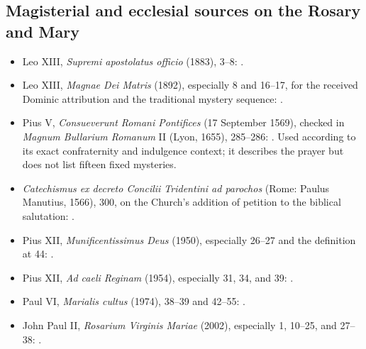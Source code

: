 \subsection{Magisterial and ecclesial sources on the Rosary and Mary}

\begin{itemize}
  \item Leo XIII, \emph{Supremi apostolatus officio} (1883), 3--8: .
  \item Leo XIII, \emph{Magnae Dei Matris} (1892), especially 8 and 16--17, for the received Dominic attribution and the traditional mystery sequence: .
  \item Pius V, \emph{Consueverunt Romani Pontifices} (17 September 1569), checked in \emph{Magnum Bullarium Romanum} II (Lyon, 1655), 285--286: . Used according to its exact confraternity and indulgence context; it describes the prayer but does not list fifteen fixed mysteries.
  \item \emph{Catechismus ex decreto Concilii Tridentini ad parochos} (Rome: Paulus Manutius, 1566), 300, on the Church's addition of petition to the biblical salutation: .
  \item Pius XII, \emph{Munificentissimus Deus} (1950), especially 26--27 and the definition at 44: .
  \item Pius XII, \emph{Ad caeli Reginam} (1954), especially 31, 34, and 39: .
  \item Paul VI, \emph{Marialis cultus} (1974), 38--39 and 42--55: .
  \item John Paul II, \emph{Rosarium Virginis Mariae} (2002), especially 1, 10--25, and 27--38: .

\end{itemize}
